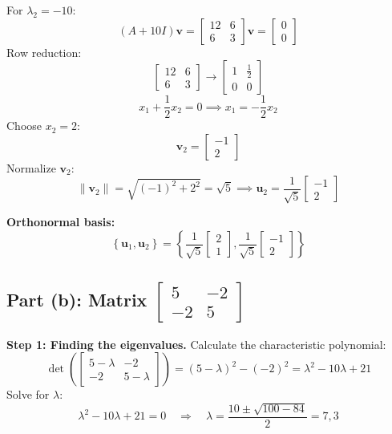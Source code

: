 \documentclass[12pt]{article}
\begin{document}
For \(\lambda_2 = -10\):
\[
(A + 10I)\mathbf{v} = \begin{bmatrix} 12 & 6 \\ 6 & 3 \end{bmatrix}\mathbf{v} = \begin{bmatrix} 0 \\ 0 \end{bmatrix}
\]
Row reduction:
\[
\begin{bmatrix} 12 & 6 \\ 6 & 3 \end{bmatrix} \rightarrow \begin{bmatrix} 1 & \frac{1}{2} \\ 0 & 0 \end{bmatrix}
\]
\[
x_1 + \frac{1}{2}x_2 = 0 \implies x_1 = -\frac{1}{2}x_2
\]
Choose \(x_2 = 2\):
\[
\mathbf{v}_2 = \begin{bmatrix} -1 \\ 2 \end{bmatrix}
\]
Normalize \(\mathbf{v}_2\):
\[
\|\mathbf{v}_2\| = \sqrt{(-1)^2 + 2^2} = \sqrt{5} \implies \mathbf{u}_2 = \frac{1}{\sqrt{5}}\begin{bmatrix} -1 \\ 2 \end{bmatrix}
\]

\textbf{Orthonormal basis:}
\[
\left\{ \mathbf{u}_1, \mathbf{u}_2 \right\} = \left\{ \frac{1}{\sqrt{5}}\begin{bmatrix} 2 \\ 1 \end{bmatrix}, \frac{1}{\sqrt{5}}\begin{bmatrix} -1 \\ 2 \end{bmatrix} \right\}
\]

\subsection*{Part (b): Matrix \( \begin{bmatrix} 5 & -2 \\ -2 & 5 \end{bmatrix} \)}
\textbf{Step 1: Finding the eigenvalues.}
Calculate the characteristic polynomial:
\[
\det\left(\begin{bmatrix} 5-\lambda & -2 \\ -2 & 5-\lambda \end{bmatrix}\right) = (5-\lambda)^2 - (-2)^2 = \lambda^2 - 10\lambda + 21
\]
Solve for \(\lambda\):
\[
\lambda^2 - 10\lambda + 21 = 0 \quad \Rightarrow \quad \lambda = \frac{10 \pm \sqrt{100 - 84}}{2} = 7, 3
\]
\end{document}
